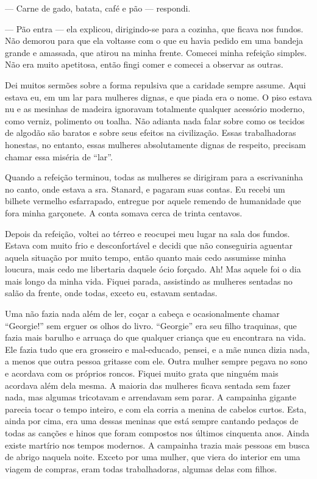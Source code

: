 --- Carne de gado, batata, café e pão --- respondi.

--- Pão entra --- ela explicou, dirigindo-se para a cozinha, que ficava
nos fundos. Não demorou para que ela voltasse com o que eu havia
pedido em uma bandeja grande e amassada, que atirou na minha frente.
Comecei minha refeição simples. Não era muito apetitosa, então fingi
comer e comecei a observar as outras.

Dei muitos sermões sobre a forma repulsiva que a caridade sempre assume.
Aqui estava eu, em um lar para mulheres dignas, e que piada era o nome.
O piso estava nu e as mesinhas de madeira ignoravam totalmente qualquer
acessório moderno, como verniz, polimento ou toalha. Não adianta nada
falar sobre como os tecidos de algodão são baratos e sobre seus efeitos
na civilização. Essas trabalhadoras honestas, no entanto, essas mulheres
absolutamente dignas de respeito, precisam chamar essa miséria de
``lar''.

Quando a refeição terminou, todas as mulheres se dirigiram para a
escrivaninha no canto, onde estava a sra. Stanard, e pagaram suas
contas. Eu recebi um bilhete vermelho esfarrapado, entregue por aquele
remendo de humanidade que fora minha garçonete. A conta somava cerca de
trinta centavos.

Depois da refeição, voltei ao térreo e reocupei meu lugar na sala dos
fundos. Estava com muito frio e desconfortável e decidi que não
conseguiria aguentar aquela situação por muito tempo, então quanto mais
cedo assumisse minha loucura, mais cedo me libertaria daquele ócio
forçado. Ah! Mas aquele foi o dia mais longo da minha vida. Fiquei
parada, assistindo as mulheres sentadas no salão da frente, onde todas,
exceto eu, estavam sentadas.

Uma não fazia nada além de ler, coçar a cabeça e ocasionalmente chamar
``Georgie!'' sem erguer os olhos do livro. ``Georgie'' era seu filho
traquinas, que fazia mais barulho e arruaça do que qualquer criança que
eu encontrara na vida. Ele fazia tudo que era grosseiro e mal-educado,
pensei, e a mãe nunca dizia nada, a menos que outra pessoa gritasse com
ele. Outra mulher sempre pegava no sono e acordava com os próprios
roncos. Fiquei muito grata que ninguém mais acordava além dela mesma. A
maioria das mulheres ficava sentada sem fazer nada, mas algumas
tricotavam e arrendavam sem parar. A campainha gigante parecia tocar o
tempo inteiro, e com ela corria a menina de cabelos curtos. Esta, ainda
por cima, era uma dessas meninas que está sempre cantando pedaços de
todas as canções e hinos que foram compostos nos últimos cinquenta anos.
Ainda existe martírio nos tempos modernos. A campainha trazia mais
pessoas em busca de abrigo naquela noite. Exceto por uma mulher, que
viera do interior em uma viagem de compras, eram todas trabalhadoras,
algumas delas com filhos.

